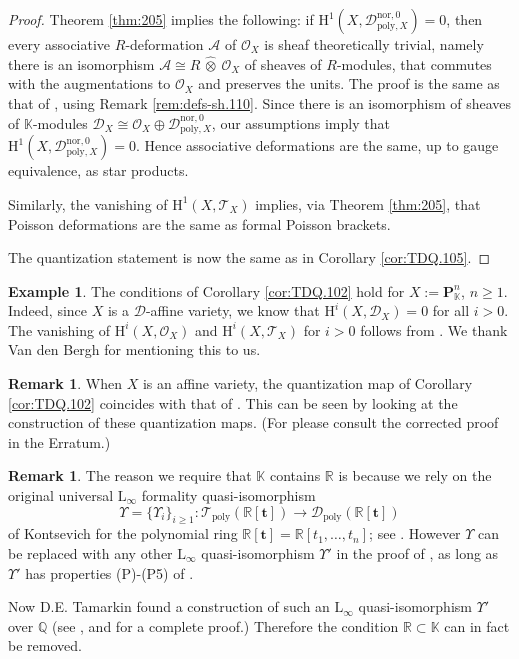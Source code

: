\documentclass[a4paper, 10pt]{amsart}
\theoremstyle{definition}
\newtheorem{rem}[equation]{Remark}
\newtheorem{exa}[equation]{Example}
\numberwithin{equation}{section}
\newcommand{\mcal}[1]{\mathcal{#1}}
\newcommand{\mbf}[1]{\mathbf{#1}}
\newcommand{\mrm}[1]{\mathrm{#1}}
\newcommand{\mbb}[1]{\mathbb{#1}}
\newcommand{\bsym}[1]{\boldsymbol{#1}}
\newcommand{\hatotimes}[1]{\, \what{{\otimes}}_{#1} \,}
\newcommand{\hot}{\hatotimes{}}
\newcommand{\what}[1]{\widehat{#1}}
\newcommand{\K}{\mbb{K}}
\newcommand{\R}{\mbb{R}}
\begin{document}
\begin{proof}
Theorem \ref{thm:205} implies the following: if 
$\mrm{H}^1(X, \mcal{D}_{\mrm{poly}, X}^{\mrm{nor}, 0}) = 0$, then every
associative $R$-deformation $\mcal{A}$ of $\mcal{O}_X$ is sheaf theoretically
trivial, namely there is an isomorphism $\mcal{A} \cong R \hot \mcal{O}_X$ of
sheaves of $R$-modules, that commutes with the augmentations to $\mcal{O}_X$
and preserves the units. 
The proof is the same as that of \cite[Theorem 1.13]{Ye1}, using Remark
\ref{rem:defs-sh.110}. Since there is an isomorphism of sheaves of $\K$-modules 
$\mcal{D}_X \cong \mcal{O}_X \oplus \mcal{D}_{\mrm{poly}, X}^{\mrm{nor}, 0}$,
our assumptions imply that 
$\mrm{H}^1(X, \mcal{D}_{\mrm{poly}, X}^{\mrm{nor}, 0}) = 0$.
Hence associative deformations are the same, up to gauge equivalence, as
star products. 

Similarly, the vanishing of $\mrm{H}^1(X, \mcal{T}_X)$ implies, via 
Theorem \ref{thm:205}, that Poisson deformations are the same as formal
Poisson brackets. 

The quantization statement is now the same as in Corollary \ref{cor:TDQ.105}.
\end{proof}

\begin{exa}
The conditions of Corollary \ref{cor:TDQ.102} hold for 
$X := \mbf{P}^n_{\K}$, $n \geq 1$. Indeed, since $X$ is a $\mcal{D}$-affine
variety, we know that $\mrm{H}^i(X, \mcal{D}_X) = 0$ for all $i > 0$. 
The vanishing of $\mrm{H}^i(X, \mcal{O}_X)$ and 
$\mrm{H}^i(X, \mcal{T}_X)$ for $i > 0$ follows from 
\cite[Theorem III.5.1 and Example II.8.20.1]{Ha}. 
We thank Van den Bergh for mentioning this to us.
\end{exa}

\begin{rem}
When $X$ is an affine variety, the quantization map of Corollary
\ref{cor:TDQ.102} coincides with that of \cite[Theorem 0.1]{Ye1}. This can be
seen by looking at the construction of these quantization maps. (For 
\cite[Theorem 0.1]{Ye1} please consult the corrected proof in the Erratum.)
\end{rem}

\begin{rem} \label{rem:TDQ.101}
The reason we require that $\K$ contains $\R$ is because we rely on the
original universal $\mrm{L}_{\infty}$ formality quasi-isomorphism 
\begin{equation} \label{eqn:extras.12}
\Upsilon = \{ \Upsilon_i \}_{i \geq 1} : 
\mcal{T}_{\mrm{poly}}(\R[\bsym{t}]) \to 
\mcal{D}_{\mrm{poly}}(\R[\bsym{t}])
\end{equation}
of Kontsevich for the polynomial ring $\R[\bsym{t}] = \R[t_1, \ldots, t_n]$; see
\cite{Ko1}. However $\Upsilon$ can be replaced with any other $\mrm{L}_{\infty}$
quasi-isomorphism
$\Upsilon'$ in the proof of \cite[Theorem 0.2]{Ye1}, as long as $\Upsilon'$ has
properties (P)-(P5) of \cite{Ko1}. 

Now D.E. Tamarkin found a construction of such an $\mrm{L}_{\infty}$
quasi-isomorphism $\Upsilon'$ over $\mbb{Q}$ (see \cite{Ta}, and
\cite[Appendix]{CV} for a complete proof.)
Therefore the condition $\R \subset \K$ can in fact be removed.
\end{rem}
\end{document}

